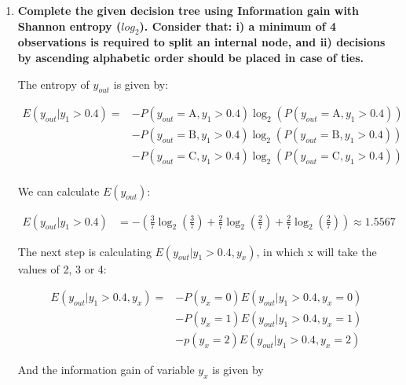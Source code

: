 \documentclass[12pt]{article}
\begin{document}
\begin{enumerate}[leftmargin=\labelsep]
    \item \textbf{Complete the given decision tree using Information gain with Shannon entropy ($log_2$).
    Consider that: i) a minimum of 4 observations is required to split an internal node, and
    ii) decisions by ascending alphabetic order should be placed in case of ties.}

    \vskip 0.3cm
    The entropy of \(y_{out}\) is given by:

    \begin{equation}
        \begin{split}
            E(y_{out} |y_1 > 0.4) =
            & - P(y_{out} = \text{A}, y_1 > 0.4) \log_2 \left(P(y_{out} = \text{A}, y_1 > 0.4)\right) \\
            & - P(y_{out} = \text{B}, y_1 > 0.4) \log_2 \left(P(y_{out} = \text{B}, y_1 > 0.4)\right)      \\
            & - P(y_{out} = \text{C}, y_1 > 0.4) \log_2 \left(P(y_{out} = \text{C}, y_1 > 0.4)\right)      \\
        \end{split}
    \end{equation}

    We can calculate $E(y_{out})$:

    \[
        \begin{aligned}
            E(y_{out} |y_1 > 0.4) & = - \left(\frac{3}{7} \log_2\left(\frac{3}{7}\right) + \frac{2}{7} \log_2\left(\frac{2}{7}\right)
                            + \frac{2}{7} \log_2\left(\frac{2}{7}\right)\right) \approx 1.5567
        \end{aligned}
    \]

    The next step is calculating $E(y_{out} | y_1 > 0.4 , y_x)$, in which x will take the values of 2, 3 or 4:

    \begin{equation}\label{exI1-e-yout-y2}
        \begin{split}
            E(y_{out} |y_1 > 0.4 , y_x) =
            & - P(y_x = 0) E(y_{out} | y_1 > 0.4 , y_x = 0) \\
            & - P(y_x = 1) E(y_{out} | y_1 > 0.4 , y_x = 1) \\
            & - p(y_x = 2) E(y_{out} | y_1 > 0.4 , y_x = 2)
        \end{split}
    \end{equation}

    And the information gain of variable $y_x$ is given by


\end{enumerate}
\end{document}
